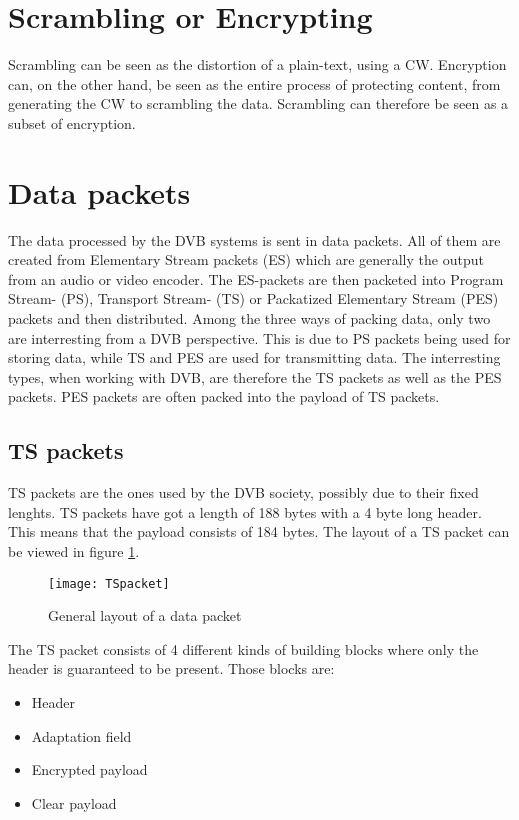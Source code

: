 
\section{Scrambling or Encrypting}
Scrambling can be seen as the distortion of a plain-text, using a CW. 
Encryption can, on the other hand, be seen as the entire process of 
protecting content, from generating the CW to scrambling the data. 
Scrambling can therefore be seen as a subset of encryption.

\section{Data packets}\label{sec:Data}
The data processed by the DVB systems is sent in data packets. All of 
them are created from Elementary Stream packets (ES) which are 
generally the output from an audio or video encoder. The ES-packets are 
then packeted into Program Stream- (PS), Transport Stream- (TS) or 
Packatized Elementary Stream (PES) packets and then distributed. Among 
the three ways of packing data, only two are interresting from a DVB 
perspective. This is due to PS packets being used for storing data, 
while TS and PES are used for transmitting data. The interresting 
types, when working with DVB, are therefore the TS packets as well as 
the PES packets. PES packets are often packed into the payload of TS 
packets.

\subsection{TS packets}
TS packets are the ones used by the DVB society, possibly due to their 
fixed lenghts. TS packets have got a length of 188 bytes with a 4 byte 
long header. This means that the payload consists of 184 bytes. The 
layout of a TS packet can be viewed in figure 
\ref{img:Package}\citep{DVB:2013}.

\begin{figure}
  \texttt{[image: TSpacket]}
  \caption{General layout of a data packet}
  \label{img:Package}
\end{figure}

The TS packet consists of 4 different kinds of building blocks where 
only the header is guaranteed to be present. Those blocks are:

\begin{itemize}
\item Header
\item Adaptation field
\item Encrypted payload
\item Clear payload
\end{itemize}

